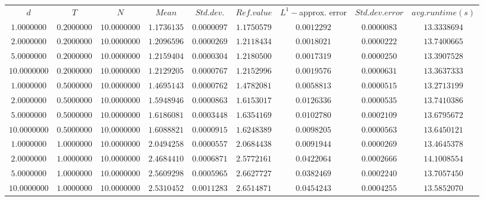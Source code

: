 \begin{tabular}{ccccccccc}
$d$ & $T$ & $N$ & $Mean$ & $Std. dev.$ & $Ref. value$ & $L^1-$approx. error & $Std. dev. error$ & $avg. runtime (s)$\\
$1.0000000$ & $0.2000000$ & $10.0000000$ & $1.1736135$ & $0.0000097$ & $1.1750579$ & $0.0012292$ & $0.0000083$ & $13.3338694$\\
$2.0000000$ & $0.2000000$ & $10.0000000$ & $1.2096596$ & $0.0000269$ & $1.2118434$ & $0.0018021$ & $0.0000222$ & $13.7400665$\\
$5.0000000$ & $0.2000000$ & $10.0000000$ & $1.2159404$ & $0.0000304$ & $1.2180500$ & $0.0017319$ & $0.0000250$ & $13.3907528$\\
$10.0000000$ & $0.2000000$ & $10.0000000$ & $1.2129205$ & $0.0000767$ & $1.2152996$ & $0.0019576$ & $0.0000631$ & $13.3637333$\\
$1.0000000$ & $0.5000000$ & $10.0000000$ & $1.4695143$ & $0.0000762$ & $1.4782081$ & $0.0058813$ & $0.0000515$ & $13.2713199$\\
$2.0000000$ & $0.5000000$ & $10.0000000$ & $1.5948946$ & $0.0000863$ & $1.6153017$ & $0.0126336$ & $0.0000535$ & $13.7410386$\\
$5.0000000$ & $0.5000000$ & $10.0000000$ & $1.6186081$ & $0.0003448$ & $1.6354169$ & $0.0102780$ & $0.0002109$ & $13.6795672$\\
$10.0000000$ & $0.5000000$ & $10.0000000$ & $1.6088821$ & $0.0000915$ & $1.6248389$ & $0.0098205$ & $0.0000563$ & $13.6450121$\\
$1.0000000$ & $1.0000000$ & $10.0000000$ & $2.0494258$ & $0.0000557$ & $2.0684438$ & $0.0091944$ & $0.0000269$ & $13.4645378$\\
$2.0000000$ & $1.0000000$ & $10.0000000$ & $2.4684410$ & $0.0006871$ & $2.5772161$ & $0.0422064$ & $0.0002666$ & $14.1008554$\\
$5.0000000$ & $1.0000000$ & $10.0000000$ & $2.5609298$ & $0.0005965$ & $2.6627727$ & $0.0382469$ & $0.0002240$ & $13.7057450$\\
$10.0000000$ & $1.0000000$ & $10.0000000$ & $2.5310452$ & $0.0011283$ & $2.6514871$ & $0.0454243$ & $0.0004255$ & $13.5852070$\\
\end{tabular}
